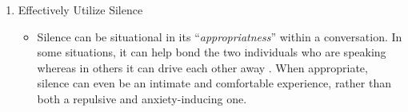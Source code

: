 \documentclass[stu,12pt]{apa7}
\begin{document}
\begin{enumerate}
        \item Effectively Utilize Silence
          \begin{itemize}
            \item Silence can be situational in its ``\textit{appropriatness}''
              within a conversation. In some situations, it can help bond the
              two individuals who are speaking whereas in others it can
              drive each other away
              \parencite[pp. 600]{gerd_antos_handbook_2008}. When appropriate,
              silence can even be an intimate and comfortable experience, rather
              than both a repulsive and anxiety-inducing one.
          \end{itemize}
      \end{enumerate}

  
  

  \newpage
  \printbibliography[%
    title={Works Cited},%
    heading={bibintoc},%
    notcategory={consulted}%
  ]

  \newpage
  \nocite{*}
  \printbibliography[%
    title={Works Consulted},%
    heading={bibintoc},%
    category={consulted}%
  ]
\end{document}
